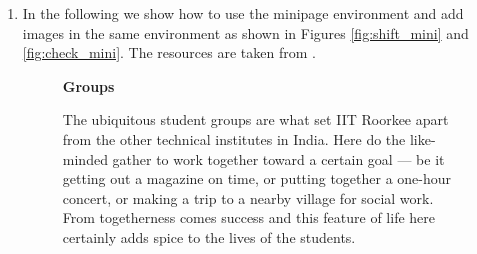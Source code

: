 \documentclass{article}
\begin{document}
\begin{enumerate}
\begin{figure}[ht]
\begin{subfigure}{0.45\textwidth}
{%
}
\caption{Shift register}
\label{shift_sub}
\end{subfigure}
\hfill
\begin{subfigure}{0.45\textwidth}
\centering
{}
\caption{Checkerboard}
\label{fig:check_sub}
\end{subfigure}

\caption{Subfigure environment}
\label{fig:subfig}
\end{figure}
\clearpage
\newpage
\item In the following we show how to use the minipage environment and add images in the same environment as shown in Figures \ref{fig:shift_mini} and \ref{fig:check_mini}. The resources are taken from \cite{Ind26}.

\begin{figure}[ht]
\centering

\begin{minipage}[t]{0.45\textwidth}
\textbf{Groups}

\vspace{4pt}

The ubiquitous student groups are what set IIT Roorkee apart
from the other technical institutes in India. Here do the like-minded
gather to work together toward a certain goal — be it getting out
a magazine on time, or putting together a one-hour concert, or making
a trip to a nearby village for social work. From togetherness comes
success and this feature of life here certainly adds spice to the lives
of the students.


\end{minipage}
\end{figure}
\end{enumerate}
\end{document}
